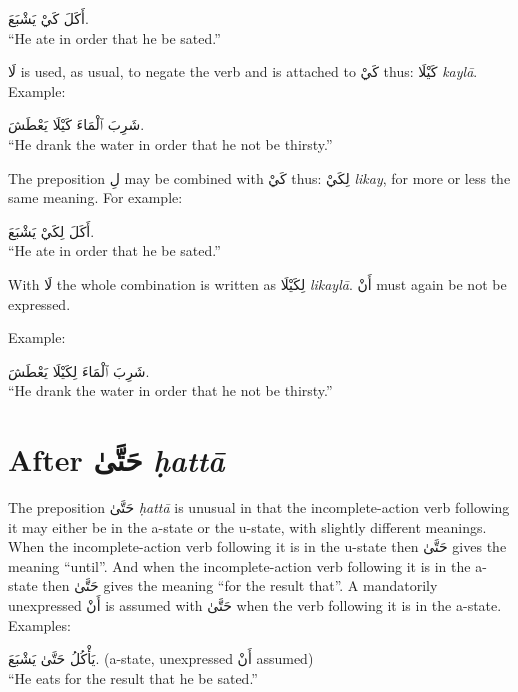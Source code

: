 \documentclass[
  10pt,
]{book}
\begin{document}
\foreignlanguage{arabic}{أَکَلَ کَيْ يَشْبَعَ.}\\
\enquote{He ate in order that he be sated.}

\foreignlanguage{arabic}{لَا} is used, as usual, to negate the verb and is attached to \foreignlanguage{arabic}{کَيْ} thus: \foreignlanguage{arabic}{کَيْلَا} \emph{kaylā}. Example:

\foreignlanguage{arabic}{شَرِبَ ٱلْمَاءَ کَيْلَا يَعْطَشَ.}\\
\enquote{He drank the water in order that he not be thirsty.}

The preposition \foreignlanguage{arabic}{لِ} may be combined with \foreignlanguage{arabic}{کَيْ} thus: \foreignlanguage{arabic}{لِکَيْ} \emph{likay}, for more or less the same meaning. For example:

\foreignlanguage{arabic}{أَکَلَ لِکَيْ يَشْبَعَ.}\\
\enquote{He ate in order that he be sated.}

With \foreignlanguage{arabic}{لَا} the whole combination is written as \foreignlanguage{arabic}{لِکَيْلَا} \emph{likaylā}. \foreignlanguage{arabic}{أَنْ} must again be not be expressed.

Example:

\foreignlanguage{arabic}{شَرِبَ ٱلْمَاءَ لِکَيْلَا يَعْطَشَ.}\\
\enquote{He drank the water in order that he not be thirsty.}

\section{\texorpdfstring{After \foreignlanguage{arabic}{حَتَّىٰ} \emph{ḥattā}}{After حَتَّىٰ ḥattā}}\label{after-ux62dux62aux649-hatta}

The preposition
\foreignlanguage{arabic}{حَتَّىٰ} \emph{ḥattā}
is unusual in that the incomplete-action verb following it may either be in the a-state or the u-state, with slightly different meanings.
When the incomplete-action verb following it is in the u-state then
\foreignlanguage{arabic}{حَتَّىٰ} gives the meaning \enquote{until}.
And when the incomplete-action verb following it is in the a-state then
\foreignlanguage{arabic}{حَتَّىٰ} gives the meaning \enquote{for the result that}.
A mandatorily unexpressed \foreignlanguage{arabic}{أَنْ} is assumed with
\foreignlanguage{arabic}{حَتَّىٰ}
when the verb following it is in the a-state.
Examples:

\foreignlanguage{arabic}{يَأْکُلُ حَتَّىٰ يَشْبَعَ.} (a-state, unexpressed \foreignlanguage{arabic}{أَنْ} assumed)\\
\enquote{He eats for the result that he be sated.}
\end{document}
